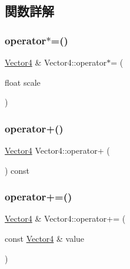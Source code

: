 \subsection{関数詳解}
\mbox{\label{struct_math_1_1_vector4_a759ab9b858421ca2d6de982af1e323b5}} 
\subsubsection{\texorpdfstring{operator$\ast$=()}{operator*=()}}
{\footnotesize\ttfamily \mbox{\hyperlink{struct_math_1_1_vector4}{Vector4}} \& Vector4\+::operator$\ast$= (\begin{DoxyParamCaption}\item[{float}]{scale }\end{DoxyParamCaption})}

\mbox{\label{struct_math_1_1_vector4_a283dc1288b3f2bf4aa6e6f26ed4f6268}} 
\subsubsection{\texorpdfstring{operator+()}{operator+()}}
{\footnotesize\ttfamily \mbox{\hyperlink{struct_math_1_1_vector4}{Vector4}} Vector4\+::operator+ (\begin{DoxyParamCaption}{ }\end{DoxyParamCaption}) const}

\mbox{\label{struct_math_1_1_vector4_ace1f44f6bf0b7a758bac3febb693d386}} 
\subsubsection{\texorpdfstring{operator+=()}{operator+=()}}
{\footnotesize\ttfamily \mbox{\hyperlink{struct_math_1_1_vector4}{Vector4}} \& Vector4\+::operator+= (\begin{DoxyParamCaption}\item[{const \mbox{\hyperlink{struct_math_1_1_vector4}{Vector4}} \&}]{value }\end{DoxyParamCaption})}

